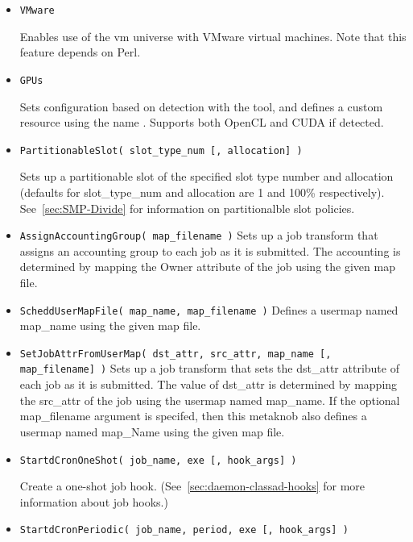 \begin{description}
\begin{itemize}
    \item \texttt{VMware}

    Enables use of the vm universe with VMware virtual machines.
    Note that this feature depends on Perl. 

    \item \texttt{GPUs}

    Sets configuration based on detection with the 
    tool, and defines a custom resource using the name .
    Supports both OpenCL and CUDA if detected. 

    \item \texttt{PartitionableSlot( slot\_type\_num [, allocation] )}

   	Sets up a partitionable slot of the specified slot type number
	and allocation (defaults for slot\_type\_num and allocation
	are 1 and 100\% respectively).
	See~\ref{sec:SMP-Divide} for information on partitionalble
	slot policies.
	
    \item \texttt{AssignAccountingGroup( map\_filename )}
	Sets up a  job transform that assigns an accounting group to
	each job as it is submitted. The accounting is determined by mapping the
	Owner attribute of the job using the given map file.

    \item \texttt{ScheddUserMapFile( map\_name, map\_filename )}
	Defines a  usermap named map\_name using the given map file.

    \item \texttt{SetJobAttrFromUserMap( dst\_attr, src\_attr, map\_name [, map\_filename] )}
	Sets up a  job transform that sets the dst\_attr attribute of each job
	as it is submitted. The value of dst\_attr is determined by mapping the src\_attr of the job
	using the usermap named map\_name.  If the optional map\_filename argument is specifed, then
	this metaknob also defines a  usermap named map\_Name using the given map file.

    \item \texttt{StartdCronOneShot( job\_name, exe [, hook\_args] )}

	Create a one-shot  job hook.
	(See~\ref{sec:daemon-classad-hooks} for more information about job hooks.)

    \item \texttt{StartdCronPeriodic( job\_name, period, exe [, hook\_args] )}


\end{itemize}
\end{description}
